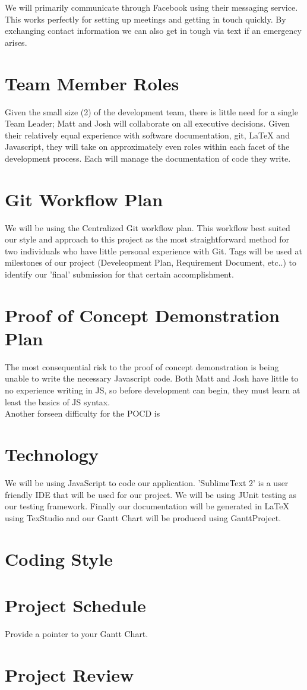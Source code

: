 \documentclass{article}
\begin{document}
	We will primarily communicate through Facebook using their messaging service. This 
	works perfectly for setting up meetings and getting in touch quickly. By exchanging 
	contact information we can also get in tough via text if an emergency arises. 
	
	\section{Team Member Roles}
	Given the small size (2) of the development team, there is little need for 
	a single Team Leader; Matt and Josh will collaborate on all executive 
	decisions. Given their relatively equal experience with software 
	documentation, git, LaTeX and Javascript, they will take on approximately 
	even roles within each facet of the development process. Each will manage 
	the documentation of code they write. 
	\section{Git Workflow Plan}
	
	We will be using the Centralized Git workflow plan. This workflow best suited our style 
	and approach to this project as the most straightforward method for two individuals 
	who have little personal experience with Git. Tags will be used at 
	milestones of our 
	project (Develeopment Plan, Requirement Document, etc..) to identify our 'final' 
	submission for that certain accomplishment. 
	
	\section{Proof of Concept Demonstration Plan}
	The most consequential risk to the proof of concept demonstration is being 
	unable to write the necessary Javascript code. Both Matt and Josh have 
	little to no experience writing in JS, so before development can begin, 
	they must learn at least the basics of JS syntax.\\
	Another forseen difficulty for the POCD is 
	\section{Technology}
	
	We will be using JavaScript to code our application. 'SublimeText 2' is a user friendly
	IDE that will be used for our project. We will be using JUnit testing as our testing 
	framework. Finally our documentation will be generated in LaTeX using TexStudio and 
	our Gantt Chart will be produced using GanttProject.
	
	\section{Coding Style}
	
	\section{Project Schedule}
	
	Provide a pointer to your Gantt Chart.
	
	\section{Project Review}
	
\end{document}

